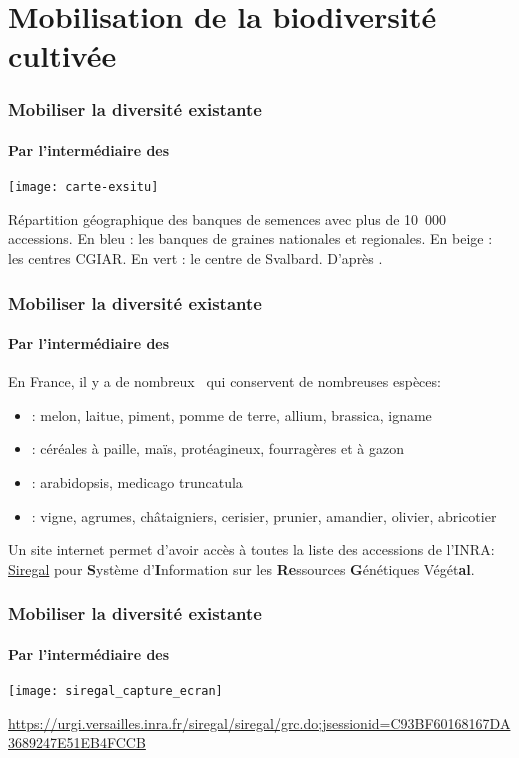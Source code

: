 \section{Mobilisation de la biodiversité cultivée}
\begin{frame}\tableofcontents[currentsection,currentsubsection,subsectionstyle=show/show/hide]\end{frame}


\begin{frame}
\frametitle{Mobiliser la diversité existante}
\framesubtitle{Par l'intermédiaire des \CRBs}

\begin{center}
\texttt{[image: carte-exsitu]}
\end{center}
\tiny{Répartition géographique des banques de semences avec plus de 10~000 accessions. En bleu : les banques de graines nationales et regionales. En beige : les centres CGIAR. En vert : le centre de Svalbard. D'après \citep{fao_second_2010}.}

\end{frame}

\begin{frame}
\frametitle{Mobiliser la diversité existante}
\framesubtitle{Par l'intermédiaire des \CRBs}

En France, il y a de nombreux \CRBs~qui conservent de nombreuses espèces:
\begin{itemize}
\item {}: melon, laitue, piment, pomme de terre, allium, brassica, igname
\item {}: céréales à paille, maïs, protéagineux, fourragères et à gazon
\item {}: arabidopsis, medicago truncatula
\item {}: vigne, agrumes, châtaigniers, cerisier, prunier, amandier, olivier, abricotier
\end{itemize}


Un site internet permet d'avoir accès à toutes la liste des accessions de l'INRA: 
\href{https://urgi.versailles.inra.fr/siregal/siregal/grc.do;jsessionid=C93BF60168167DA3689247E51EB4FCCB}{Siregal} pour \textbf{S}ystème d'\textbf{I}nformation sur les \textbf{Re}ssources \textbf{G}énétiques Végét\textbf{al}.

\end{frame}

\begin{frame}
\frametitle{Mobiliser la diversité existante}
\framesubtitle{Par l'intermédiaire des \CRBs}

\begin{center}
\texttt{[image: siregal\_capture\_ecran]}
\end{center}

\url{https://urgi.versailles.inra.fr/siregal/siregal/grc.do;jsessionid=C93BF60168167DA3689247E51EB4FCCB}

\end{frame}

